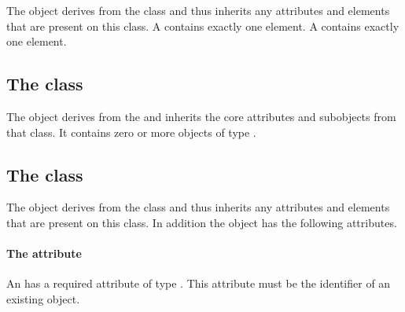 The \MixedGeometry object derives from the \GeometryDefinition class and
thus inherits any attributes and elements that are present on this
class.
A \MixedGeometry contains exactly one \ListOfGeometryDefinitions
element.
A \MixedGeometry contains exactly one \ListOfOrdinalMappings element.
\subsection{The  class}
\label{listofordinalmappings-class}


The \ListOfOrdinalMappings object derives from the  and
inherits the core attributes and subobjects from that class. It contains
zero or more objects of type \OrdinalMapping.

\subsection{The  class}
\label{ordinalmapping-class}




The \OrdinalMapping object derives from the \SBase class and thus
inherits any attributes and elements that are present on this class.
In addition the \OrdinalMapping object has the following attributes.

\paragraph{The \fixttspace{} attribute}

An \OrdinalMapping has a required attribute 
of type .
This attribute must be the identifier of an existing \GeometryDefinition
object.


